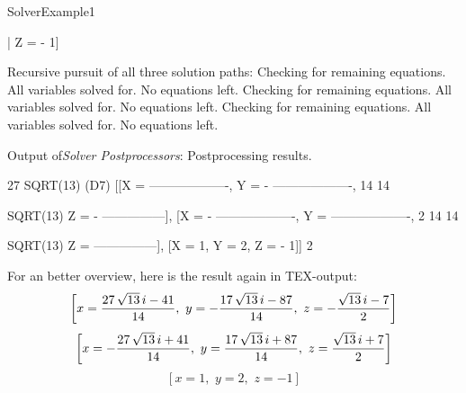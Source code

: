 \begin{example}{SolverExample1}
\begin{literatim}{|}
                                                                   Z = - 1]

{\rm{}Recursive pursuit of all three solution paths:}
Checking for remaining equations.
All variables solved for. No equations left.
Checking for remaining equations.
All variables solved for. No equations left.
Checking for remaining equations.
All variables solved for. No equations left.

{\rm{}Output of}{\em Solver Postprocessors}{\rm:}
Postprocessing results.

            27 SQRT(13) %
(D7) [[X = -------------------, Y = - -------------------,
                    14                         14

      SQRT(13) %
Z = - ---------------], [X = - -------------------, Y = -------------------,
             2                         14                       14

    SQRT(13) %
Z = ---------------], [X = 1, Y = 2, Z = - 1]]
           2
\end{literatim}
For an better overview, here is the result again in TEX-output:
\begin{equation}
\left[
   x = {{27\,\sqrt{13}\,i-41}\over{14}},  \,\,
   y = -{{17\,\sqrt{13}\,i-87}\over{14}}, \,\,
   z = -{{\sqrt{13}\,i-7}\over{2}}
\right]
\end{equation}
\begin{equation}
\left[
   x = -{{27\,\sqrt{13}\,i+41}\over{14}}, \,\,
   y = {{17\,\sqrt{13}\,i+87}\over{14}}, \,\,
   z = {{\sqrt{13}\,i+7}\over{2}}
\right]
\end{equation}
\begin{equation}
\left[
   x =  1, \,\,
   y =  2, \,\,
   z = -1 
\right]
\end{equation}
\end{example}

